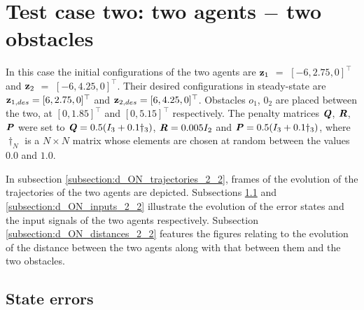 \section{Test case two: two agents $-$ two obstacles}

In this case the initial configurations of the two agents are
$\bm{\mathbf{z}}_1$ $=$ $[-6, 2.75, 0]^{\top}$ and
$\bm{\mathbf{z}}_2$ $=$ $[-6, 4.25, 0]^{\top}$.
Their desired configurations in steady-state are
$\bm{\mathbf{z}}_{1,des} = [6, 2.75, 0]^{\top}$ and
$\bm{\mathbf{z}}_{2,des} = [6, 4.25, 0]^{\top}$.
Obstacles $o_1$, $0_2$ are placed between the two, at $[0, 1.85]^{\top}$
and $[0, 5.15]^{\top}$ respectively. The penalty
matrices $\bm{\mathit{Q}}$, $\bm{\mathit{R}}$, $\bm{\mathit{P}}$ were set to
$\bm{\mathit{Q}} = 0.5 (I_3 + 0.1 \dagger_3)$, $\bm{\mathit{R}} = 0.005 I_2$ and
$\bm{\mathit{P}} = 0.5 (I_3 + 0.1 \dagger_3)$, where $\dagger_N$ is a $N \times N$
matrix whose elements are chosen at random between the values $0.0$ and $1.0$.

In subsection \ref{subsection:d_ON_trajectories_2_2}, frames of the evolution of the
trajectories of the two agents are depicted. Subsections
\ref{subsection:d_ON_errors_2_2} and \ref{subsection:d_ON_inputs_2_2} illustrate
the evolution of the error states and the input signals of the two agents
respectively. Subsection \ref{subsection:d_ON_distances_2_2} features the
figures relating to the evolution of the distance between the two agents
along with that between them and the two obstacles.


\subsection{State errors}
\label{subsection:d_ON_errors_2_2}

\noindent{}


